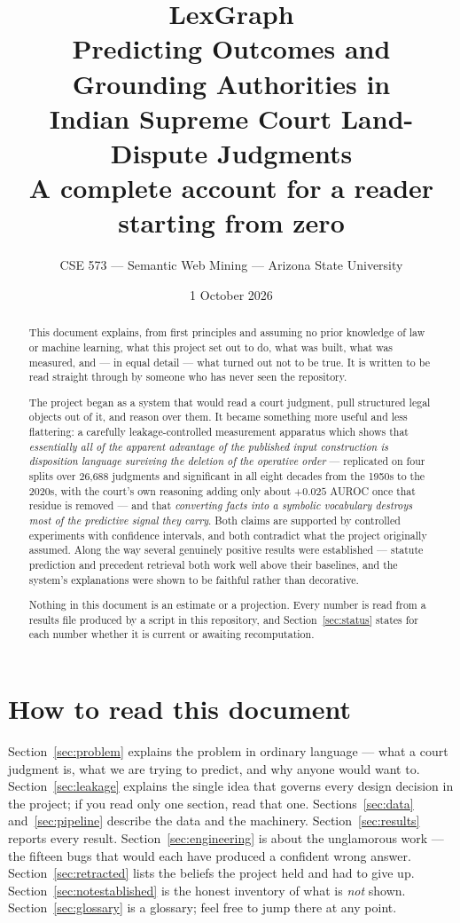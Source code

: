 \documentclass[12pt,a4paper]{article}
\title{\textbf{LexGraph}\\[4pt]
\large Predicting Outcomes and Grounding Authorities in\\
Indian Supreme Court Land-Dispute Judgments\\[10pt]
\normalsize A complete account for a reader starting from zero}
\author{CSE 573 --- Semantic Web Mining --- Arizona State University}
\date{1 October 2026}
\begin{document}
\maketitle

\begin{abstract}
\noindent
This document explains, from first principles and assuming no prior knowledge of law or machine
learning, what this project set out to do, what was built, what was measured, and --- in equal
detail --- what turned out not to be true. It is written to be read straight through by someone
who has never seen the repository.

The project began as a system that would read a court judgment, pull structured legal objects out
of it, and reason over them. It became something more useful and less flattering: a carefully
leakage-controlled measurement apparatus which shows that \emph{essentially all of the apparent
advantage of the published input construction is disposition language surviving the deletion of the
operative order} --- replicated on four splits over 26,688 judgments and significant in all eight
decades from the 1950s to the 2020s, with the court's own reasoning adding only about $+0.025$ AUROC
once that residue is removed --- and that
\emph{converting facts into a symbolic vocabulary destroys most of the predictive signal they
carry}. Both claims are supported by controlled experiments with confidence intervals, and both
contradict what the project originally assumed. Along the way several genuinely positive results
were established --- statute prediction and precedent retrieval both work well above their
baselines, and the system's explanations were shown to be faithful rather than decorative.

Nothing in this document is an estimate or a projection. Every number is read from a results file
produced by a script in this repository, and Section~\ref{sec:status} states for each number
whether it is current or awaiting recomputation.
\end{abstract}

\tableofcontents
\newpage

\section{How to read this document}

Section~\ref{sec:problem} explains the problem in ordinary language --- what a court judgment is,
what we are trying to predict, and why anyone would want to. Section~\ref{sec:leakage} explains the
single idea that governs every design decision in the project; if you read only one section, read
that one. Sections~\ref{sec:data} and~\ref{sec:pipeline} describe the data and the machinery.
Section~\ref{sec:results} reports every result. Section~\ref{sec:engineering} is about the
unglamorous work --- the fifteen bugs that would each have produced a confident wrong answer.
Section~\ref{sec:retracted} lists the beliefs the project held and had to give up.
Section~\ref{sec:notestablished} is the honest inventory of what is \emph{not} shown.
Section~\ref{sec:glossary} is a glossary; feel free to jump there at any point.
\end{document}
